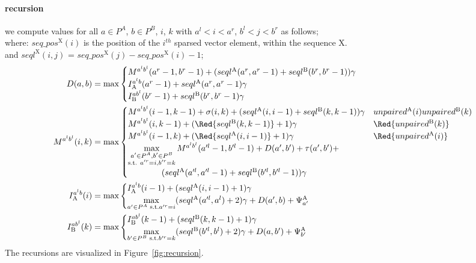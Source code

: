 \documentclass{article}
\newcommand{\DTmat}[2]{D(#1,#2)}
\newcommand{\MTmat}[4]{M^{{#1}^l {#2}^l}(#3,#4)}
\newcommand{\IATmat}[3]{I^{{#1}^l {#2}}_\textrm{A}(#3)}
\newcommand{\IBTmat}[3]{I^{{#1} {#2}^l}_\textrm{B}(#3)}
\newcommand{\numPos}[3]{seql^\textrm{#1}(#2,#3)}
\newcommand{\numPosA}[2]{\numPos{A}{#1}{#2}}
\newcommand{\numPosB}[2]{\numPos{B}{#1}{#2}}
\newcommand{\seqPos}[2]{seq\_pos^\textrm{#1}(#2)}
\newcommand{\unpairedA}[1]{unpaired^\textrm{A}{(#1)}}
\newcommand{\unpairedB}[1]{unpaired^\textrm{B}{(#1)}}
\newcommand{\PsiA}[1]{\Psi^\textrm{A}_{#1}}
\begin{document}
\paragraph{recursion}
we compute values for all $a\in P^A$, $b\in P^B$, $i$, $k$
with $a^l<i<a^r$, $b^l<j<b^r$ as follows;\\ 
where:  $\seqPos{X}{i}$ is the position of the $i^{th}$ sparsed vector element, within the sequence X.\\
and $\numPos{X}{i}{j}$ = $\seqPos{X}{j} - \seqPos{X}{i} -1$;
\begin{align}
  \DTmat{a}{b} &= \max
  \begin{cases}
    \MTmat{a}{b}{a^r-1}{b^r-1} + (\numPosA{a^r}{a^r-1} + \numPosB{b^r}{b^r-1})\gamma\\
    \IATmat{a}{b}{a^r-1} + \numPosA{a^r}{a^r-1}\gamma\\
    \IBTmat{a}{b}{b^r-1} + \numPosB{b^r}{b^r-1}\gamma
  \end{cases}\label{recursionD}\\
  \MTmat{a}{b}{i}{k} &= \max
  \begin{cases}
    \MTmat{a}{b}{i-1}{k-1} + \sigma(i,k) + (\numPosA{i}{i-1} + \numPosB{k}{k-1})\gamma & \unpairedA{i} \unpairedB{k}\\
    \MTmat{a}{b}{i}{k-1} + (\Red{\numPosB{k}{k-1}}+1)\gamma & \Red{\unpairedB{k}}\\
    \MTmat{a}{b}{i-1}{k} + (\Red{\numPosA{i}{i-1}}+1)\gamma & \Red{\unpairedA{i}}\\
    \max_{\substack{a'\in P^A,b'\in P^B\\\text{s.t. } a'^r=i, b'^r=k}}\limits \MTmat{a}{b}{a'^l-1}{b'^l-1} + \DTmat{a'}{b'} + \tau(a',b') + \\ \qquad\qquad (\numPosA{a'^l}{a'^l-1} + \numPosB{b'^l}{b'^l-1})\gamma
  \end{cases}\label{recursionM}\\
  \IATmat{a}{b}{i} &= \max
  \begin{cases}
    \IATmat{a}{b}{i-1} + (\numPosA{i}{i-1} + 1)\gamma\\
    \max_{a'\in P^A\text{ s.t.} a'^r=i}\limits (\numPosA{a'^l}{a^l}+2)\gamma + \DTmat{a'}{b} +  \PsiA{a'}
  \end{cases}\label{recursionIA}\\
  \IBTmat{a}{b}{k} &= \max
  \begin{cases}
    \IBTmat{a}{b}{k-1} + (\numPosB{k}{k-1} + 1)\gamma\\
    \max_{b'\in P^B\text{ s.t.} b'^r=k}\limits (\numPosB{b'^l}{b^l}+2)\gamma +
    \DTmat{a}{b'} + \PsiA{b'}
  \end{cases}\label{recursionIB}
\end{align}
The recursions are visualized in Figure~\ref{fig:recursion}.
\end{document}
